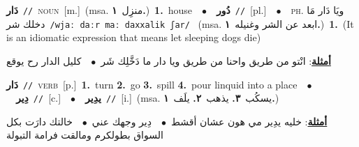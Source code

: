 \documentclass[10pt,a4paper,twoside]{article} %
\begin{document}
\begin{multicols}{2}
{\setlength\topsep{0pt}\textbf{\foreignlanguage{arabic}{دَار}}\ {\color{gray}\texttt{//}\color{black}}\ \textsc{noun}\ [m.]\ \color{gray}(msa. \foreignlanguage{arabic}{منزِل}~\foreignlanguage{arabic}{\textbf{١.}})\color{black}\ \textbf{1.}~house\ \ $\bullet$\ \ \setlength\topsep{0pt}\textbf{\foreignlanguage{arabic}{دُور}}\ {\color{gray}\texttt{//}\color{black}}\ [pl.]\ \ $\bullet$\ \ \textsc{ph.} \color{gray} \foreignlanguage{arabic}{ويَا دَار مَا دخلك شر}\color{black}\ {\color{gray}\texttt{/{\sffamily wjaː daːr maː daxxalik ʃar}/}\color{black}}\ \color{gray} (msa. \foreignlanguage{arabic}{ابعد عن الشر وغنيله}~\foreignlanguage{arabic}{\textbf{١.}})\color{black}\ \textbf{1.}~(It is an idiomatic expression that means let sleeping dogs die)\  \begin{flushright}\color{gray}\foreignlanguage{arabic}{\textbf{\underline{\foreignlanguage{arabic}{أمثلة}}}: انْتو من طريق واحنا من طريق ويا دار ما دَخَّلِك شَر\ $\bullet$\ \  كليل الدار رح يوقع}\end{flushright}\color{black}} \vspace{2mm}

{\setlength\topsep{0pt}\textbf{\foreignlanguage{arabic}{دَار}}\ {\color{gray}\texttt{//}\color{black}}\ \textsc{verb}\ [p.]\ \textbf{1.}~turn  \textbf{2.}~go  \textbf{3.}~spill  \textbf{4.}~pour linquid into a place\ \ $\bullet$\ \ \setlength\topsep{0pt}\textbf{\foreignlanguage{arabic}{دِير}}\ {\color{gray}\texttt{//}\color{black}}\ [c.]\ \ $\bullet$\ \ \setlength\topsep{0pt}\textbf{\foreignlanguage{arabic}{يدِير}}\ {\color{gray}\texttt{//}\color{black}}\ [i.]\ \color{gray}(msa. \foreignlanguage{arabic}{يسكُب}~\foreignlanguage{arabic}{\textbf{٣.}}  \foreignlanguage{arabic}{يذهب}~\foreignlanguage{arabic}{\textbf{٢.}}  \foreignlanguage{arabic}{يلَف}~\foreignlanguage{arabic}{\textbf{١.}})\color{black}\  \begin{flushright}\color{gray}\foreignlanguage{arabic}{\textbf{\underline{\foreignlanguage{arabic}{أمثلة}}}: خليه يدِير مي هون عشان أقشط\ $\bullet$\ \  دِير وجهك عني\ $\bullet$\ \  خالتك دارَت بكل السواق بطولكرم ومالقت فرامة التبولة}\end{flushright}\color{black}} \vspace{2mm}


\end{multicols}
\end{document}
